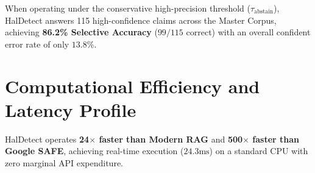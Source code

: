 When operating under the conservative high-precision threshold ($\tau_{\text{abstain}}$), HalDetect answers 115 high-confidence claims across the Master Corpus, achieving \textbf{86.2\% Selective Accuracy} ($99 / 115$ correct) with an overall confident error rate of only $13.8\%$.

\section{Computational Efficiency and Latency Profile}
\label{sec:latency_profile}

\begin{table}[htbp]
\centering
\small
\caption{End-to-end compute, latency, and economic footprint per verified claim.}
\label{tab:latency_profile}
\end{table}

HalDetect operates \textbf{24$\times$ faster than Modern RAG} and \textbf{500$\times$ faster than Google SAFE}, achieving real-time execution ($24.3\text{ms}$) on a standard CPU with zero marginal API expenditure.
